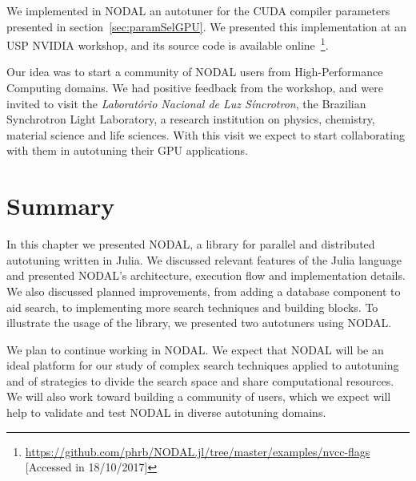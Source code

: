We implemented in NODAL an autotuner for the CUDA compiler parameters presented
in section~\ref{sec:paramSelGPU}. We presented this implementation at an USP
NVIDIA workshop, and its source code is available
online~\footnote{\url{https://github.com/phrb/NODAL.jl/tree/master/examples/nvcc-flags}
[Accessed in 18/10/2017]}.

Our idea was to start a community of NODAL users from High-Performance
Computing domains. We had positive feedback from the workshop, and were invited
to visit the \textit{Laboratório Nacional de Luz Síncrotron}, the Brazilian
Synchrotron Light Laboratory, a research institution on physics, chemistry,
material science and life sciences.  With this visit we expect to start
collaborating with them in autotuning their GPU applications.

\section{Summary}
\label{sec:concl}

In this chapter we presented NODAL, a library for parallel and distributed
autotuning written in Julia. We discussed relevant features of the Julia
language and presented NODAL's architecture, execution flow and implementation
details. We also discussed planned improvements, from adding a database
component to aid search, to implementing more search techniques and building
blocks. To illustrate the usage of the library, we presented two autotuners
using NODAL.

We plan to continue working in NODAL.  We expect that NODAL will be an ideal
platform for our study of complex search techniques applied to autotuning and
of strategies to divide the search space and share computational resources.  We
will also work toward building a community of users, which we expect will help
to validate and test NODAL in diverse autotuning domains.
